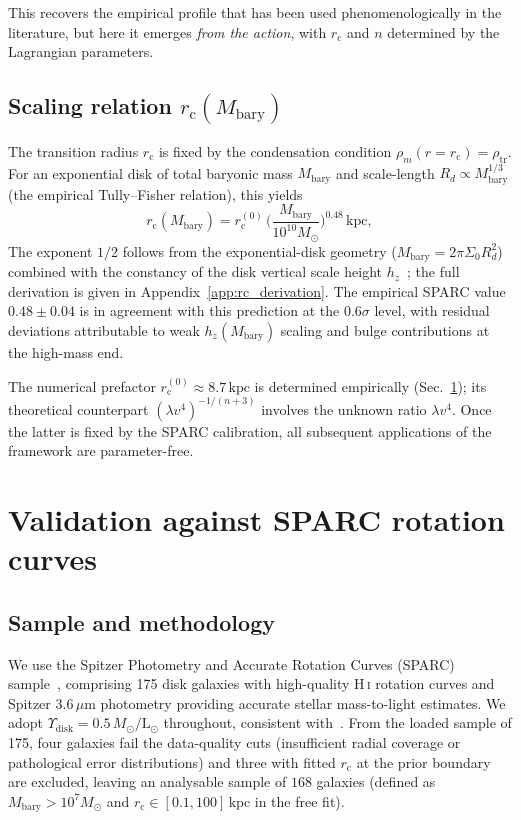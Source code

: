 \documentclass[%
    aps,
    prd,
    reprint,
    superscriptaddress,
    nofootinbib,
    floatfix,
    amsmath,amssymb,
]{revtex4-2}
\newcommand{\Msun}{M_{\odot}}
\newcommand{\Mbary}{M_{\mathrm{bary}}}
\newcommand{\rc}{r_{\mathrm{c}}}
\newcommand{\kpc}{\,\mathrm{kpc}}
\begin{document}
This recovers the empirical profile that has been used
phenomenologically in the literature, but here it emerges
\emph{from the action}, with $\rc$ and $n$ determined by the
Lagrangian parameters.

\subsection{Scaling relation $\rc(\Mbary)$}

The transition radius $\rc$ is fixed by the condensation condition
$\rho_{m}(r=\rc) = \rho_{\mathrm{tr}}$. For an exponential disk
of total baryonic mass $\Mbary$ and scale-length $R_{d}\propto
\Mbary^{1/3}$ (the empirical Tully--Fisher relation), this yields
\begin{equation}
\label{eq:rc_M}
\rc(\Mbary) = \rc^{(0)}\,
   \biggl(\frac{\Mbary}{10^{10}\Msun}\biggr)^{0.48}\!\!\!\kpc,
\end{equation}
The exponent $1/2$ follows from the exponential-disk geometry
($\Mbary=2\pi\Sigma_{0}R_{d}^{2}$) combined with the constancy
of the disk vertical scale height $h_{z}$~\cite{Yoachim2006};
the full derivation is given in Appendix~\ref{app:rc_derivation}.
The empirical SPARC value $0.48\pm 0.04$ is in agreement with this
prediction at the $0.6\sigma$ level, with residual deviations
attributable to weak $h_{z}(\Mbary)$ scaling and bulge
contributions at the high-mass end.

The numerical prefactor $\rc^{(0)} \approx 8.7\kpc$ is
determined empirically (Sec.~\ref{sec:sparc}); its theoretical
counterpart $(\lambda v^{4})^{-1/(n+3)}$ involves the unknown
ratio $\lambda v^{4}$. Once the latter is fixed by the SPARC
calibration, all subsequent applications of the framework are
parameter-free.

\section{Validation against SPARC rotation curves}
\label{sec:sparc}

\subsection{Sample and methodology}

We use the Spitzer Photometry and Accurate Rotation Curves (SPARC)
sample~\cite{Lelli2016}, comprising 175 disk galaxies with
high-quality H\,\textsc{i} rotation curves and Spitzer 3.6\,$\mu$m
photometry providing accurate stellar mass-to-light estimates. We
adopt $\Upsilon_{\mathrm{disk}}=0.5\,\Msun/\mathrm{L}_{\odot}$
throughout, consistent with~\cite{Lelli2016}. From the loaded sample
of 175, four galaxies fail the data-quality cuts (insufficient radial
coverage or pathological error distributions) and three with
fitted $\rc$ at the prior boundary are excluded, leaving an
analysable sample of $168$ galaxies (defined as
$\Mbary>10^{7}\Msun$ and $\rc\in[0.1,100]\kpc$ in the free fit).
\end{document}
